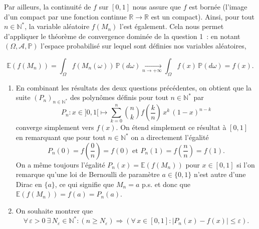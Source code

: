 Par ailleurs, la continuité de \(f\) sur \([0,1]\) nous assure que \(f\)
est bornée (l'image d'un compact par une fonction continue
\(\mathbb{R}\to \mathbb{R}\) est un compact). Ainsi, pour tout
\(n\in\mathbb{N}^\ast\), la variable aléatoire \(f\left(M_n\right)\)
l'est également. Cela nous permet d'appliquer le théorème de convergence
dominée de la question 1~: en notant \((\Omega,\mathcal{A},\mathbb{P})\)
l'espace probabilisé sur lequel sont définies nos variables aléatoires,

\[\mathbb{E}\left( f\left(M_n\right) \right) = \int_{\Omega} f\left(M_n(\omega)\right)\,\mathbb{P}(d\omega) \xrightarrow[n\to+\infty]{} \int_{\Omega} f(x)\,\mathbb{P}(d\omega) = f(x).\]

\begin{enumerate}
\def\labelenumi{\arabic{enumi}.}
\setcounter{enumi}{2}
\item
  En combinant les résultats des deux questions précédentes, on obtient
  que la suite \(\left(P_n\right)_{n\in\mathbb{N}^\ast}\) des polynômes
  définis pour tout \(n\in\mathbb{N}^\ast\) par
  \[P_n : x \in ]0,1[ \mapsto \sum_{k=0}^{n} \binom{n}{k} f\left(\dfrac{k}{n}\right)\, x^k\,(1-x)^{n-k}\]
  converge simplement vers \(f(x)\). On étend simplement ce résultat à
  \([0,1]\) en remarquant que pour tout \(n\in\mathbb{N}^\ast\) on a
  directement l'égalité
  \[P_n(0) = f\left(\dfrac{0}{n}\right) = f(0) \text{ et } P_n(1) = f\left(\dfrac{n}{n}\right) = f(1).\]
  On a même toujours l'égalité
  \(P_n(x) = \mathbb{E}\left( f\left(M_n\right) \right)\) pour
  \(x\in[0,1]\) si l'on remarque qu'une loi de Bernoulli de paramètre
  \(a\in \{0,1\}\) n'est autre d'une Dirac en \(\{a\}\), ce qui signifie
  que \(M_n = a\) p.s. et donc que
  \(\mathbb{E}\left(f(M_n)\right) = f(a) = P_n(a)\).
\item
  On souhaite montrer que
  \[\forall\,\varepsilon > 0 \ \exists\,N_\varepsilon\in\mathbb{N}^\ast : \left(n\geq N_\varepsilon\right) \Rightarrow \left(\forall\,x\in[0,1] : \left|P_n(x) - f(x)\right|\leq \varepsilon\right).\]
\end{enumerate}


